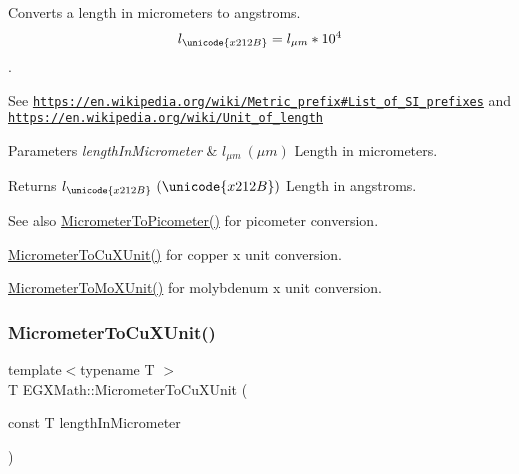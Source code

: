 Converts a length in micrometers to angstroms. \[ l_{\unicode{x212B}}=l_{\mu m} * 10^{4} \]. 

See \href{https://en.wikipedia.org/wiki/Metric_prefix#List_of_SI_prefixes}{\tt https\+://en.\+wikipedia.\+org/wiki/\+Metric\+\_\+prefix\#\+List\+\_\+of\+\_\+\+S\+I\+\_\+prefixes} and \href{https://en.wikipedia.org/wiki/Unit_of_length}{\tt https\+://en.\+wikipedia.\+org/wiki/\+Unit\+\_\+of\+\_\+length} 
\begin{DoxyParams}{Parameters}
{\em length\+In\+Micrometer} & $ l_{\mu m}\ (\mu m)$ Length in micrometers. \\
\hline
\end{DoxyParams}
\begin{DoxyReturn}{Returns}
$ l_{\unicode{x212B}}\ (\unicode{x212B})$ Length in angstroms. 
\end{DoxyReturn}
\begin{DoxySeeAlso}{See also}
\mbox{\hyperlink{group___e_g_x_math-_conversions-_length_conversions-_s_i-_micrometer-_s_i_ga912ed4989391eeb5d25f43e99108502e}{Micrometer\+To\+Picometer()}} for picometer conversion. 

\mbox{\hyperlink{group___e_g_x_math-_conversions-_length_conversions-_s_i-_micrometer-_non-_s_i_ga9ec609bbfdde5144c9f40d9093a5b8a7}{Micrometer\+To\+Cu\+X\+Unit()}} for copper x unit conversion. 

\mbox{\hyperlink{group___e_g_x_math-_conversions-_length_conversions-_s_i-_micrometer-_non-_s_i_ga2ed475ce56e23d7783d6925f5b409f44}{Micrometer\+To\+Mo\+X\+Unit()}} for molybdenum x unit conversion. 
\end{DoxySeeAlso}
\mbox{\label{group___e_g_x_math-_conversions-_length_conversions-_s_i-_micrometer-_non-_s_i_ga9ec609bbfdde5144c9f40d9093a5b8a7}} 
\subsubsection{\texorpdfstring{Micrometer\+To\+Cu\+X\+Unit()}{MicrometerToCuXUnit()}}
{\footnotesize\ttfamily template$<$typename T $>$ \\
T E\+G\+X\+Math\+::\+Micrometer\+To\+Cu\+X\+Unit (\begin{DoxyParamCaption}\item[{const T}]{length\+In\+Micrometer }\end{DoxyParamCaption})}



